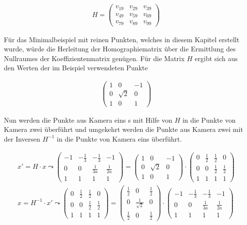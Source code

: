 \begin{gather}
	H=
	\begin{pmatrix}
		v_{19}&v_{29}&v_{39}\\
		v_{49}&v_{59}&v_{69}\\
		v_{79}&v_{89}&v_{99}
	\end{pmatrix}
\end{gather}

Für das Minimalbeispiel mit reinen Punkten, welches in diesem Kapitel erstellt wurde, würde die Herleitung der Homographiematrix über die Ermittlung des Nullraumes der Koeffizientenmatrix genügen. Für die Matrix $H$ ergibt sich aus den Werten der im Beispiel verwendeten Punkte

\begin{gather}
	\begin{pmatrix}
		1&0&-1\\
		0&\sqrt{2}&0\\
		1&0&1
	\end{pmatrix}
\end{gather}

Nun werden die Punkte aus Kamera eins s mit Hilfe von $H$ in die Punkte von Kamera zwei überführt und umgekehrt werden die Punkte aus Kamera zwei mit der Inversen $H^{-1}$ in die Punkte von Kamera eins überführt. 

\begin{gather}
	x'=H \cdot x \leadsto 
	\begin{pmatrix}
		-1&-\frac{1}{3}&-\frac{1}{3}&-1\\
		0&0&\frac{1}{3a}&\frac{1}{2a}\\
		1&1&1&1
	\end{pmatrix}= 	\begin{pmatrix}
		1&0&-1\\
		0&\sqrt{2}&0\\
		1&0&1
	\end{pmatrix}
	\cdot
	\begin{pmatrix}
		0&\frac{1}{2}&\frac{1}{2}&0\\
		0&0&\frac{1}{2}&\frac{1}{2}\\
		1&1&1&1
	\end{pmatrix}\\
	x=H^{-1} \cdot x' \leadsto 
	\begin{pmatrix}
		0&\frac{1}{2}&\frac{1}{2}&0\\
		0&0&\frac{1}{2}&\frac{1}{2}\\
		1&1&1&1
	\end{pmatrix}
	= 	\begin{pmatrix}
		\frac{1}{2}&0&\frac{1}{2}\\
		0&\frac{1}{\sqrt{2}}&0\\
		\frac{1}{2}&0&\frac{1}{2}
	\end{pmatrix}
	\cdot
	\begin{pmatrix}
		-1&-\frac{1}{3}&-\frac{1}{3}&-1\\
		0&0&\frac{1}{3a}&\frac{1}{2a}\\
		1&1&1&1
	\end{pmatrix}
\end{gather}



